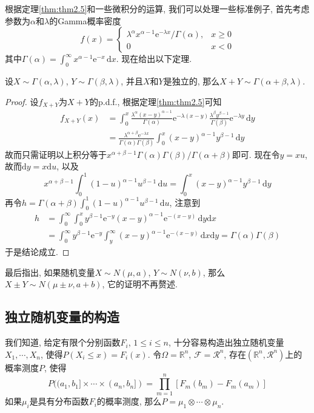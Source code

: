 \documentclass[cn, 12pt, math=mtpro2, bibstyle=apa, blue, twocol]{elegantbook}
\newcommand{\F}{\mathcal{F}}
\newcommand{\R}{\mathbb{R}}
\begin{document}
根据定理\ref{thm:thm2.5}和一些微积分的运算, 我们可以处理一些标准例子, 首先考虑参数为$\alpha$和$\lambda$的Gamma概率密度
$$f(x)=\begin{cases}
         \lambda^\alpha x^{\alpha-1}\text{e}^{-\lambda x}/\Gamma(\alpha), & x\ge0 \\
         0 & x<0
       \end{cases}$$
其中$\Gamma(\alpha)=\int_{0}^{\infty}x^{\alpha-1}\text{e}^{-x}\,\text{d}x$. 现在给出以下定理.
\begin{theorem}
  设$X\sim \Gamma(\alpha,\lambda)$, $Y\sim \Gamma(\beta,\lambda)$, 并且$X$和$Y$是独立的, 那么$X+Y\sim\Gamma(\alpha+\beta,\lambda)$.
\end{theorem}
\begin{proof}
  设$f_{X+Y}$为$X+Y$的p.d.f., 根据定理\ref{thm:thm2.5}可知
  \begin{align*}
  f_{X+Y}(x)&=\int_{0}^{x}\frac{\lambda^\alpha(x-y)^{\alpha-1}}{\Gamma(\alpha)}\text{e}^{-\lambda(x-y)}\frac{\lambda^\beta y^{\beta-1}}{\Gamma(\beta)}\text{e}^{-\lambda y}\,\text{d}y \\
  &=\frac{\lambda^{\alpha+\beta}\text{e}^{-\lambda x}}{\Gamma(\alpha)\Gamma(\beta)}\int_{0}^{x}(x-y)^{\alpha-1}y^{\beta-1}\,\text{d}y
  \end{align*}
  故而只需证明以上积分等于$x^{\alpha+\beta-1}\Gamma(\alpha)\Gamma(\beta)/\Gamma(\alpha+\beta)$即可. 现在令$y=xu$, 故而$\text{d}y=x\text{d}u$, 以及
  $$x^{\alpha+\beta-1}\int_{0}^{1}(1-u)^{\alpha-1}u^{\beta-1}\,\text{d}u=\int_{0}^{x}(x-y)^{\alpha-1}y^{\beta-1}\,\text{d}y$$
  再令$h=\Gamma(\alpha+\beta)\int_{0}^{1}(1-u)^{\alpha-1}u^{\beta-1}\,\text{d}u$, 注意到
  \begin{align*}
  h&=\int_{0}^{\infty}\int_{0}^{x}y^{\beta-1}\text{e}^{-y}(x-y)^{\alpha-1}\text{e}^{-(x-y)}\,\text{d}y\text{d}x \\
  &=\int_{0}^{\infty}y^{\beta-1}\text{e}^{-y}\int_{y}^{\infty}(x-y)^{\alpha-1}\text{e}^{-(x-y)}\,\text{d}x\text{d}y=\Gamma(\alpha)\Gamma(\beta)
  \end{align*}
  于是结论成立.
\end{proof}
最后指出, 如果随机变量$X\sim N(\mu,a)$, $Y\sim N(\nu,b)$, 那么$X\pm Y\sim N(\mu\pm\nu,a+b)$, 它的证明不再赘述.
\subsection{独立随机变量的构造}
我们知道, 给定有限个分别函数$F_i$, $1\leq i\leq n$, 十分容易构造出独立随机变量$X_1,\cdots,X_n$, 使得$P(X_i\leq x)=F_i(x)$. 令$\Omega=\R^n$, $\F=\mathcal{R}^n$, 存在$(\R^n,\mathcal{R}^n)$上的概率测度$P$, 使得
\begin{equation}\label{eq2.16}
  P((a_1,b_1]\times\cdots\times (a_n,b_n])=\prod_{m=1}^{n}[F_m(b_m)-F_m(a_m)]
\end{equation}
如果$\mu_i$是具有分布函数$F_i$的概率测度, 那么$P=\mu_1\otimes\cdots\otimes\mu_n$.
\end{document}
